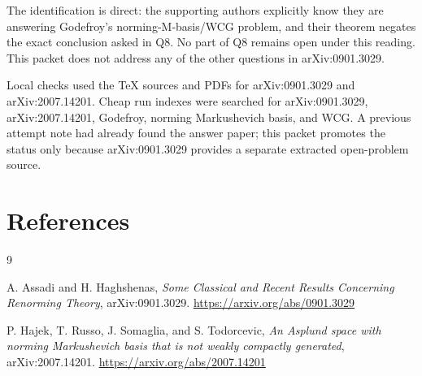 \documentclass[11pt]{article}
\begin{document}
The identification is direct: the supporting authors explicitly know they are
answering Godefroy's norming-M-basis/WCG problem, and their theorem negates the
exact conclusion asked in Q8. No part of Q8 remains open under this reading.
This packet does not address any of the other questions in arXiv:0901.3029.

Local checks used the TeX sources and PDFs for arXiv:0901.3029 and
arXiv:2007.14201. Cheap run indexes were searched for arXiv:0901.3029,
arXiv:2007.14201, Godefroy, norming Markushevich basis, and WCG. A previous
attempt note had already found the answer paper; this packet promotes the
status only because arXiv:0901.3029 provides a separate extracted
open-problem source.

\section*{References}

\begin{thebibliography}{9}

A. Assadi and H. Haghshenas,
\emph{Some Classical and Recent Results Concerning Renorming Theory},
arXiv:0901.3029.
\url{https://arxiv.org/abs/0901.3029}

P. Hajek, T. Russo, J. Somaglia, and S. Todorcevic,
\emph{An Asplund space with norming Markushevich basis that is not weakly
compactly generated},
arXiv:2007.14201.
\url{https://arxiv.org/abs/2007.14201}

\end{thebibliography}
\end{document}
